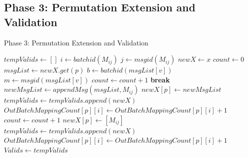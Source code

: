 \documentclass{article}
\begin{document}
\subsection{Phase 3: Permutation Extension and Validation}

\begin{algorithm}[H]
\caption{Phase 3: Permutation Extension and Validation}
\begin{algorithmic}[1]
    \State $tempValids \gets []$
        \State $ i \gets batchid(M_{ij}) $
        \State $ j \gets msgid(M_{ij}) $
            \State $ newX \gets x $
            \State $count \gets 0$
            \State $ msgList \gets newX.get(p) $
                \State {}
                    \State $ b \gets batchid(msgList[v]) $
                    \State $ m \gets msgid(msgList[v]) $
                        \State $count \gets count + 1$
                    \Else
                        \State \textbf{break}
                    \EndIf
                \EndFor
                    \State $ newMsgList \gets appendMsg( msgList,M_{ij})$
                    \State $newX[p] \gets newMsgList $
                    \State $tempValids \gets tempValids.append(newX)$
                    \State $ OutBatchMappingCount[p][i] \gets OutBatchMappingCount[p][i] + 1$
                \EndIf
            \Else
                \State {}
                        \State $count \gets count + 1$
                    \EndIf
                \EndFor
                    \State $newX [p] \gets  [M_{ij}] $
                    \State $ tempValids \gets tempValids.append(newX) $
                    \State $ OutBatchMappingCount[p][i] \gets OutBatchMappingCount[p][i] + 1 $
                \EndIf
            \EndIf
        \EndFor
    \EndFor
    \State $ Valids \gets tempValids $
\EndIf
\end{algorithmic}
\end{algorithm}
\end{document}
